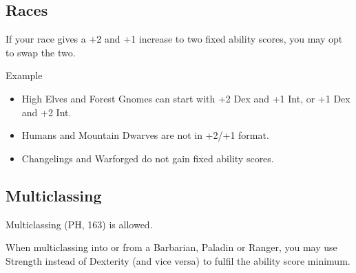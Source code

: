 \documentclass[letterpaper,twocolumn,openany,nodeprecatedcode]{dndbook}
\begin{document}
\subsection{Races}
If your race gives a +2 and +1 increase to two fixed ability scores, you may opt to swap the two.

\begin{DndComment}{Example}
\begin{itemize}
\item High Elves and Forest Gnomes can start with +2 Dex and +1 Int, or +1 Dex and +2 Int.
\item Humans and Mountain Dwarves are not in +2/+1 format.
\item Changelings and Warforged do not gain fixed ability scores.
\end{itemize}

\end{DndComment}

\subsection{Multiclassing}
Multiclassing (PH, 163) is allowed. 

When multiclassing into or from a Barbarian, Paladin or Ranger, you may use Strength instead of Dexterity (and vice versa) to fulfil the ability score minimum. 
\end{document}
